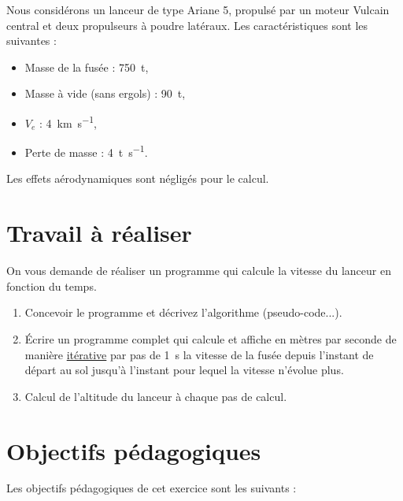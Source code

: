 \documentclass[french,a4paper,addpoints,11pt]{exam}
\begin{document}
\begin{questions}
\begin{multicols}{2}
        Nous considérons un lanceur de type Ariane 5, propulsé par un moteur Vulcain central et deux propulseurs à poudre latéraux. Les caractéristiques sont les suivantes :

        \begin{itemize}
            \item Masse de la fusée : \SI{750}{\tonne},
            \item Masse à vide (sans ergols) : \SI{90}{\tonne},
            \item $V_e$ : \SI{4}{\km\per\second},
            \item Perte de masse : \SI{4}{\tonne\per\second}.
        \end{itemize}

        Les effets aérodynamiques sont négligés pour le calcul.

        \section*{Travail à réaliser}

        On vous demande de réaliser un programme qui calcule la vitesse du lanceur en fonction du temps.

        \begin{enumerate}
            \item Concevoir le programme et décrivez l'algorithme (pseudo-code...).
            \item Écrire un programme complet qui calcule et affiche en mètres par seconde de manière \underline{itérative} par pas de \SI{1}{\second} la vitesse de la fusée depuis l'instant de départ au sol jusqu'à l'instant pour lequel la vitesse n'évolue plus.
            \item Calcul de l'altitude du lanceur à chaque pas de calcul.
        \end{enumerate}

        \section*{Objectifs pédagogiques}

        Les objectifs pédagogiques de cet exercice sont les suivants :


\end{multicols}
\end{questions}
\end{document}
